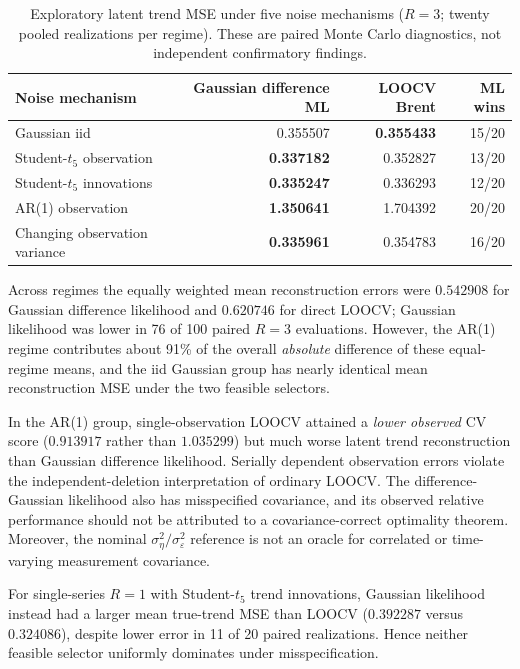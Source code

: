 \documentclass[11pt]{article}
\begin{document}
\begin{table}[ht]
\centering
\caption{Exploratory latent trend MSE under five noise mechanisms
($R=3$; twenty pooled realizations per regime). These are paired
Monte Carlo diagnostics, not independent confirmatory findings.}
\label{tab:robustness-pilot}
\begin{tabular}{lrrr}
\toprule
Noise mechanism & Gaussian difference ML & LOOCV Brent & ML wins\\
\midrule
Gaussian iid & 0.355507 & \textbf{0.355433} & 15/20\\
Student-$t_5$ observation & \textbf{0.337182} & 0.352827 & 13/20\\
Student-$t_5$ innovations & \textbf{0.335247} & 0.336293 & 12/20\\
AR(1) observation & \textbf{1.350641} & 1.704392 & 20/20\\
Changing observation variance & \textbf{0.335961} & 0.354783 & 16/20\\
\bottomrule
\end{tabular}
\end{table}
Across regimes the equally weighted mean reconstruction errors were
$0.542908$ for Gaussian difference likelihood and $0.620746$
for direct LOOCV; Gaussian likelihood was lower in 76 of 100
paired $R=3$ evaluations. However, the AR(1) regime contributes
about 91\% of the overall \emph{absolute} difference of these
equal-regime means, and the iid Gaussian group has nearly identical
mean reconstruction MSE under the two feasible selectors.

In the AR(1) group, single-observation LOOCV attained a
\emph{lower observed} CV score ($0.913917$ rather than $1.035299$)
but much worse latent trend reconstruction than Gaussian difference
likelihood. Serially dependent observation errors violate the
independent-deletion interpretation of ordinary LOOCV. The
difference-Gaussian likelihood also has misspecified covariance,
and its observed relative performance should not be attributed
to a covariance-correct optimality theorem. Moreover, the nominal
$\sigma_\eta^2/\sigma_\varepsilon^2$ reference is not an oracle for
correlated or time-varying measurement covariance.

For single-series $R=1$ with Student-$t_5$ trend innovations,
Gaussian likelihood instead had a larger mean true-trend MSE
than LOOCV ($0.392287$ versus $0.324086$), despite lower error
in 11 of 20 paired realizations. Hence neither feasible selector
uniformly dominates under misspecification.
\end{document}
